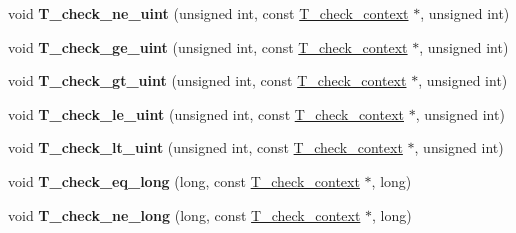 \begin{DoxyCompactItemize}
\item 
\mbox{\label{group__RTEMSTestFrameworkImpl_gac78b1ea5b97578b1e5d302563b6621ae}} 
void {\bfseries T\+\_\+check\+\_\+ne\+\_\+uint} (unsigned int, const \mbox{\hyperlink{structT__check__context}{T\+\_\+check\+\_\+context}} $\ast$, unsigned int)
\item 
\mbox{\label{group__RTEMSTestFrameworkImpl_ga34fa0bb867e853af3aeef0ac8e3d14df}} 
void {\bfseries T\+\_\+check\+\_\+ge\+\_\+uint} (unsigned int, const \mbox{\hyperlink{structT__check__context}{T\+\_\+check\+\_\+context}} $\ast$, unsigned int)
\item 
\mbox{\label{group__RTEMSTestFrameworkImpl_gaf315c23ec9a23fbd805584573324a35a}} 
void {\bfseries T\+\_\+check\+\_\+gt\+\_\+uint} (unsigned int, const \mbox{\hyperlink{structT__check__context}{T\+\_\+check\+\_\+context}} $\ast$, unsigned int)
\item 
\mbox{\label{group__RTEMSTestFrameworkImpl_ga32f43657b88f1672f0f2fabe9368a64e}} 
void {\bfseries T\+\_\+check\+\_\+le\+\_\+uint} (unsigned int, const \mbox{\hyperlink{structT__check__context}{T\+\_\+check\+\_\+context}} $\ast$, unsigned int)
\item 
\mbox{\label{group__RTEMSTestFrameworkImpl_ga2289690b5ed6c10872619eaa7207b8c5}} 
void {\bfseries T\+\_\+check\+\_\+lt\+\_\+uint} (unsigned int, const \mbox{\hyperlink{structT__check__context}{T\+\_\+check\+\_\+context}} $\ast$, unsigned int)
\item 
\mbox{\label{group__RTEMSTestFrameworkImpl_gaad34b0afc3f5d211d2a6e2771b11188f}} 
void {\bfseries T\+\_\+check\+\_\+eq\+\_\+long} (long, const \mbox{\hyperlink{structT__check__context}{T\+\_\+check\+\_\+context}} $\ast$, long)
\item 
\mbox{\label{group__RTEMSTestFrameworkImpl_ga6cb6f91b4990112179fd901ab53bfe6f}} 
void {\bfseries T\+\_\+check\+\_\+ne\+\_\+long} (long, const \mbox{\hyperlink{structT__check__context}{T\+\_\+check\+\_\+context}} $\ast$, long)
\item 
\mbox{\label{group__RTEMSTestFrameworkImpl_ga9483f63082998c5cf5aa2758b85c57b8}} 

\end{DoxyCompactItemize}
